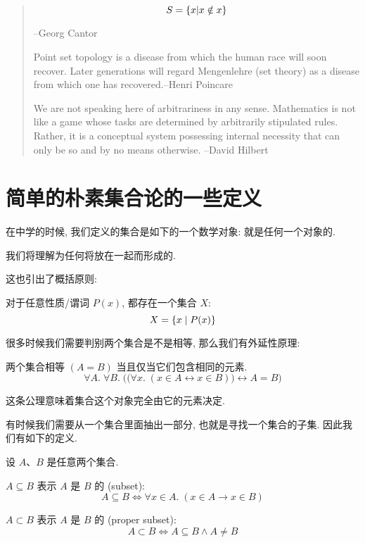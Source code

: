 \begin{quote}
	$$S=\{x|x\notin x\}$$
	
	\hfill --Georg Cantor

	Point set topology is a disease from which the human race will soon recover. Later generations will regard Mengenlehre (set theory) as a disease from which one has recovered.\hfill --Henri Poincare
	
	We are not speaking here of arbitrariness in any sense. Mathematics is not like a game whose tasks are determined by arbitrarily stipulated rules. Rather, it is a conceptual system possessing internal necessity that can only be so and by no means otherwise. \hfill --David Hilbert
\end{quote}

\section{简单的朴素集合论的一些定义}

在中学的时候, 我们定义的集合是如下的一个数学对象: 就是任何一个对象的. 

\begin{definition}[集合]
    我们将理解为任何将放在一起而形成的. 
\end{definition}

这也引出了概括原则: 

\begin{theorem}[概括原则]
    对于任意性质/谓词 $P(x)$, 都存在一个集合 $X$:
    \[
      X = \{x \mid P(x)\}
    \]
\end{theorem}

很多时候我们需要判别两个集合是不是相等, 那么我们有外延性原理: 
\begin{definition}
    两个集合相等 $(A = B)$ 当且仅当它们包含相同的元素. 
    \[
      \forall A.\; \forall B.\;
        \Big(\big(\forall x.\; (x \in A \leftrightarrow x \in B)\big)
          \leftrightarrow A = B \Big)
    \]
\end{definition}

这条公理意味着集合这个对象完全由它的元素决定. 

有时候我们需要从一个集合里面抽出一部分, 也就是寻找一个集合的子集. 因此我们有如下的定义. 

\begin{definition}[子集]
    设 $A$、$B$ 是任意两个集合. 

    $A \subseteq B$ 表示 $A$ 是 $B$ 的 (subset):
    \[
      A \subseteq B \iff \forall x \in A.\; (x \in A \to x \in B)
    \]

    $A \subset B$ 表示 $A$ 是 $B$ 的 (proper subset):
    \[
      A \subset B \iff A \subseteq B \land A \neq B
    \]
\end{definition}


